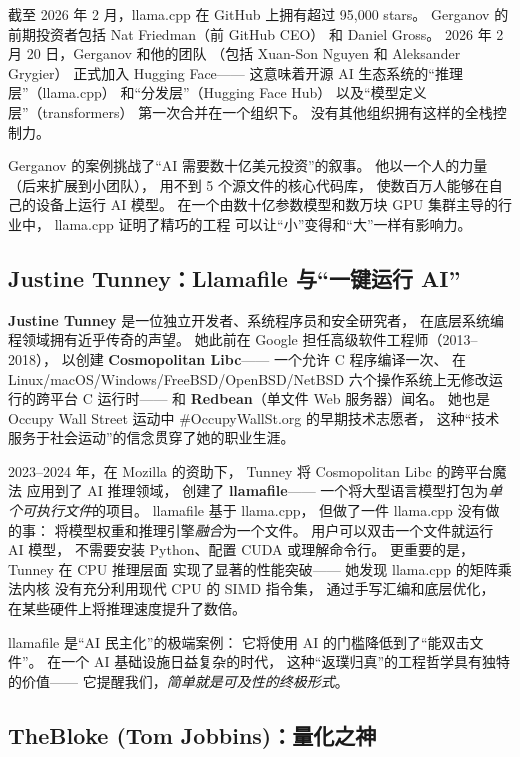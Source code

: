 截至 2026 年 2 月，llama.cpp 在 GitHub 上拥有超过 95,000 stars。
Gerganov 的前期投资者包括 Nat Friedman（前 GitHub CEO）
和 Daniel Gross。
2026 年 2 月 20 日，Gerganov 和他的团队
（包括 Xuan-Son Nguyen 和 Aleksander Grygier）
正式加入 Hugging Face——
这意味着开源 AI 生态系统的``推理层''（llama.cpp）
和``分发层''（Hugging Face Hub）
以及``模型定义层''（transformers）
第一次合并在一个组织下。
没有其他组织拥有这样的全栈控制力。

\begin{corebox}[一个人改变一个行业]
Gerganov 的案例挑战了``AI 需要数十亿美元投资''的叙事。
他以一个人的力量（后来扩展到小团队），
用不到 5 个源文件的核心代码库，
使数百万人能够在自己的设备上运行 AI 模型。
在一个由数十亿参数模型和数万块 GPU 集群主导的行业中，
llama.cpp 证明了精巧的工程
可以让``小''变得和``大''一样有影响力。
\end{corebox}

\subsection{Justine Tunney：Llamafile 与``一键运行 AI''}

\textbf{Justine Tunney} 是一位独立开发者、系统程序员和安全研究者，
在底层系统编程领域拥有近乎传奇的声望。
她此前在 Google 担任高级软件工程师（2013--2018），
以创建 \textbf{Cosmopolitan Libc}——
一个允许 C 程序编译一次、
在 Linux/macOS/Windows/FreeBSD/OpenBSD/NetBSD
六个操作系统上无修改运行的跨平台 C 运行时——
和 \textbf{Redbean}（单文件 Web 服务器）闻名。
她也是 Occupy Wall Street 运动中
\#OccupyWallSt.org 的早期技术志愿者，
这种``技术服务于社会运动''的信念贯穿了她的职业生涯。

2023--2024 年，在 Mozilla 的资助下，
Tunney 将 Cosmopolitan Libc 的跨平台魔法
应用到了 AI 推理领域，
创建了 \textbf{llamafile}——
一个将大型语言模型打包为\emph{单个可执行文件}的项目。
llamafile 基于 llama.cpp，
但做了一件 llama.cpp 没有做的事：
将模型权重和推理引擎\emph{融合}为一个文件。
用户可以双击一个文件就运行 AI 模型，
不需要安装 Python、配置 CUDA 或理解命令行。
更重要的是，Tunney 在 CPU 推理层面
实现了显著的性能突破——
她发现 llama.cpp 的矩阵乘法内核
没有充分利用现代 CPU 的 SIMD 指令集，
通过手写汇编和底层优化，
在某些硬件上将推理速度提升了数倍。

llamafile 是``AI 民主化''的极端案例：
它将使用 AI 的门槛降低到了``能双击文件''。
在一个 AI 基础设施日益复杂的时代，
这种``返璞归真''的工程哲学具有独特的价值——
它提醒我们，\emph{简单就是可及性的终极形式}。

\subsection{TheBloke (Tom Jobbins)：量化之神}


